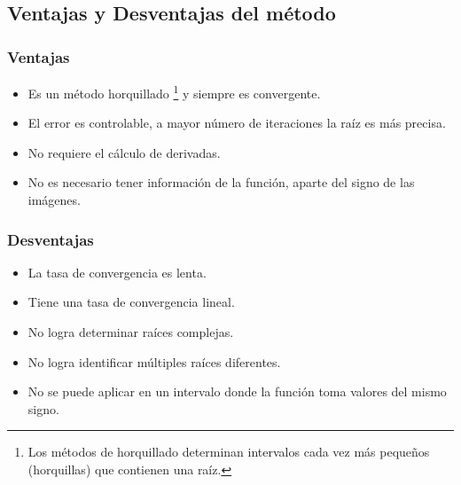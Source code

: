 \subsection{Ventajas y Desventajas del método}

\subsubsection{Ventajas}

\begin{itemize}
    \item Es un método horquillado \footnote{Los métodos de horquillado determinan intervalos cada vez más pequeños (horquillas) que contienen una raíz.} y siempre es convergente.
    \item El error es controlable, a mayor número de iteraciones la raíz es más precisa.
    \item No requiere el cálculo de derivadas.
    \item No es necesario tener información de la función, aparte del signo de las imágenes.

\end{itemize}

\subsubsection{Desventajas}

\begin{itemize}
    \item La tasa de convergencia es lenta.
    \item Tiene una tasa de convergencia lineal.
    \item No logra determinar raíces complejas.
    \item No logra identificar múltiples raíces diferentes.
    \item No se puede aplicar en un intervalo donde la función toma valores del mismo signo.

\end{itemize}
